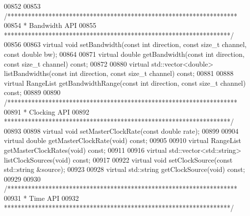 \begin{DoxyCode}
00852 
00853     \textcolor{comment}{/*******************************************************************}
00854 \textcolor{comment}{     * Bandwidth API}
00855 \textcolor{comment}{     ******************************************************************/}
00856 
00863     \textcolor{keyword}{virtual} \textcolor{keywordtype}{void} setBandwidth(\textcolor{keyword}{const} \textcolor{keywordtype}{int} direction, \textcolor{keyword}{const} \textcolor{keywordtype}{size\_t} channel, \textcolor{keyword}{const} \textcolor{keywordtype}{double} 
      bw);
00864 
00871     \textcolor{keyword}{virtual} \textcolor{keywordtype}{double} getBandwidth(\textcolor{keyword}{const} \textcolor{keywordtype}{int} direction, \textcolor{keyword}{const} \textcolor{keywordtype}{size\_t} channel) \textcolor{keyword}{const};
00872 
00880     \textcolor{keyword}{virtual} std::vector<double> listBandwidths(\textcolor{keyword}{const} \textcolor{keywordtype}{int} direction, \textcolor{keyword}{const} \textcolor{keywordtype}{size\_t} channel) \textcolor{keyword}{const};
00881 
00888     \textcolor{keyword}{virtual} RangeList getBandwidthRange(\textcolor{keyword}{const} \textcolor{keywordtype}{int} direction, \textcolor{keyword}{const} \textcolor{keywordtype}{size\_t} channel) \textcolor{keyword}{const};
00889 
00890     \textcolor{comment}{/*******************************************************************}
00891 \textcolor{comment}{     * Clocking API}
00892 \textcolor{comment}{     ******************************************************************/}
00893 
00898     \textcolor{keyword}{virtual} \textcolor{keywordtype}{void} setMasterClockRate(\textcolor{keyword}{const} \textcolor{keywordtype}{double} rate);
00899 
00904     \textcolor{keyword}{virtual} \textcolor{keywordtype}{double} getMasterClockRate(\textcolor{keywordtype}{void}) \textcolor{keyword}{const};
00905 
00910     \textcolor{keyword}{virtual} RangeList getMasterClockRates(\textcolor{keywordtype}{void}) \textcolor{keyword}{const};
00911 
00916     \textcolor{keyword}{virtual} std::vector<std::string> listClockSources(\textcolor{keywordtype}{void}) \textcolor{keyword}{const};
00917 
00922     \textcolor{keyword}{virtual} \textcolor{keywordtype}{void} setClockSource(\textcolor{keyword}{const} std::string &source);
00923 
00928     \textcolor{keyword}{virtual} std::string getClockSource(\textcolor{keywordtype}{void}) \textcolor{keyword}{const};
00929 
00930     \textcolor{comment}{/*******************************************************************}
00931 \textcolor{comment}{     * Time API}
00932 \textcolor{comment}{     ******************************************************************/}

\end{DoxyCode}
